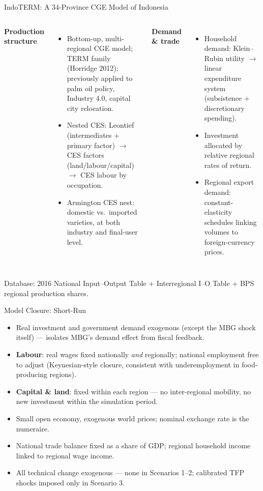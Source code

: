 \documentclass[11pt,aspectratio=169]{beamer}
\begin{document}
\begin{frame}{IndoTERM: A 34-Province CGE Model of Indonesia}
\footnotesize
\begin{columns}[T,onlytextwidth]
	\textbf{Production structure}
	\begin{itemize}\setlength\itemsep{4pt}
		\item Bottom-up, multi-regional CGE model; TERM family (Horridge 2012); previously applied to palm oil policy, Industry 4.0, capital city relocation.
		\item Nested CES: Leontief (intermediates + primary factor) $\to$ CES factors (land/labour/capital) $\to$ CES labour by occupation.
		\item Armington CES nest: domestic vs.\ imported varieties, at both industry and final-user level.
	\end{itemize}
	\textbf{Demand \& trade}
	\begin{itemize}\setlength\itemsep{4pt}
		\item Household demand: Klein--Rubin utility $\to$ linear expenditure system (subsistence + discretionary spending).
		\item Investment allocated by relative regional rates of return.
		\item Regional export demand: constant-elasticity schedules linking volumes to foreign-currency prices.
	\end{itemize}
\end{columns}
\bigskip
{\scriptsize Database: 2016 National Input--Output Table + Interregional I--O Table + BPS regional production shares.}
\end{frame}

\begin{frame}{Model Closure: Short-Run}
\footnotesize
\begin{itemize}\setlength\itemsep{7pt}
	\item Real investment and government demand exogenous (except the MBG shock itself) --- isolates MBG's demand effect from fiscal feedback.
	\item \textbf{Labour}: real wages fixed nationally \emph{and} regionally; national employment free to adjust (Keynesian-style closure, consistent with underemployment in food-producing regions).
	\item \textbf{Capital \& land}: fixed within each region --- no inter-regional mobility, no new investment within the simulation period.
	\item Small open economy, exogenous world prices; nominal exchange rate is the numeraire.
	\item National trade balance fixed as a share of GDP; regional household income linked to regional wage income.
	\item All technical change exogenous --- none in Scenarios 1--2; calibrated TFP shocks imposed only in Scenario 3.
\end{itemize}
\end{frame}
\end{document}

